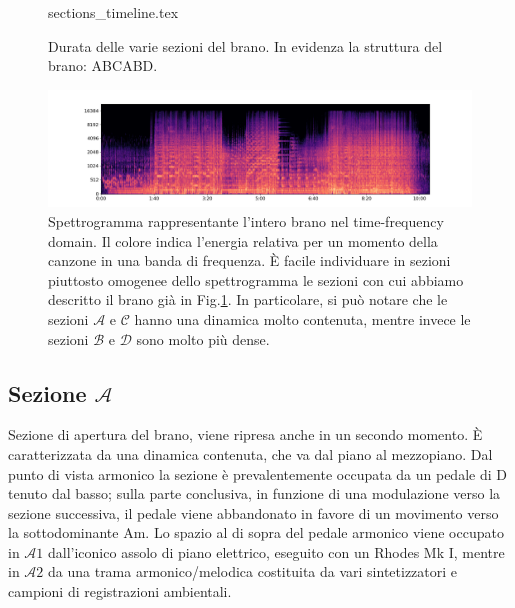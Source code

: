\documentclass[class=book, crop=false, oneside, 12pt]{standalone}
\begin{document}
    \begin{figure}[htbp]
        \centering
        {sections_timeline.tex}
        \caption[Durata delle varie sezioni del brano.]{Durata delle varie sezioni del brano. In evidenza la struttura del brano: ABCABD.}
        \label{fig:04-sections-timeline}
    \end{figure}

    \begin{figure}[htbp]
        \centering
        \includegraphics[width=\textwidth]{sheep_spectrogram.png}
        \caption[Spettrogramma rappresentante l'intero brano nel time-frequency domain.]{Spettrogramma rappresentante l'intero brano nel time-frequency domain. Il colore indica l'energia relativa per un momento della canzone in una banda di frequenza. È facile individuare in sezioni piuttosto omogenee dello spettrogramma le sezioni con cui abbiamo descritto il brano già in Fig.\ref{fig:04-sections-timeline}. In particolare, si può notare che  le sezioni \(\mathcal{A}\) e \(\mathcal{C}\) hanno una dinamica molto contenuta, mentre invece le sezioni \(\mathcal{B}\) e \(\mathcal{D}\) sono molto più dense.}
        \label{fig:sheep-spectrogram}
    \end{figure}

    \subsection*{Sezione \(\mathcal{A}\)}
    Sezione di apertura del brano, viene ripresa anche in un secondo momento. È caratterizzata da una dinamica contenuta, che va dal piano al mezzopiano. Dal punto di vista armonico la sezione è prevalentemente occupata da un pedale di D tenuto dal basso; sulla parte conclusiva, in funzione di una modulazione verso la sezione successiva, il pedale viene abbandonato in favore di un movimento verso la sottodominante Am. Lo spazio al di sopra del pedale armonico viene occupato in \(\mathcal{A}1\) dall'iconico assolo di piano elettrico, eseguito con un Rhodes Mk I, mentre in \(\mathcal{A}2\) da una trama armonico/melodica costituita da vari sintetizzatori e campioni di registrazioni ambientali.
\end{document}
